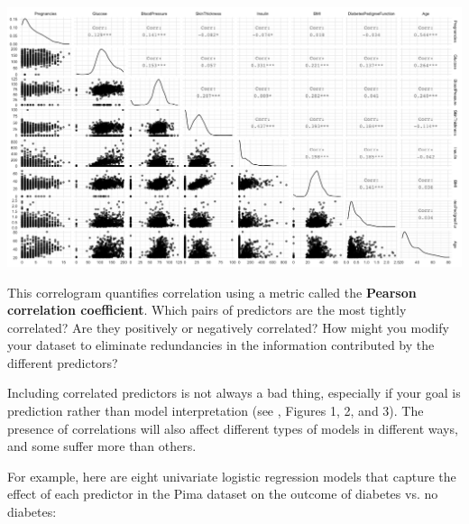 \begin{center}
\includegraphics[width=\textwidth]{img/pima-ggpairs.png}
\end{center}

\begin{question}{}
This correlogram quantifies correlation using a metric called the \textbf{Pearson correlation coefficient}. Which pairs of predictors are the most tightly correlated? Are they positively or negatively correlated? How might you modify your dataset to eliminate redundancies in the information contributed by the different predictors?
\end{question}

Including correlated predictors is not always a bad thing, especially if your goal is prediction rather than model interpretation (see \cite{guyon2003introduction}, Figures 1, 2, and 3). The presence of correlations will also affect different types of models in different ways, and some suffer more than others. 

For example, here are eight univariate logistic regression models that capture the effect of each predictor in the Pima dataset on the outcome of diabetes vs. no diabetes:

